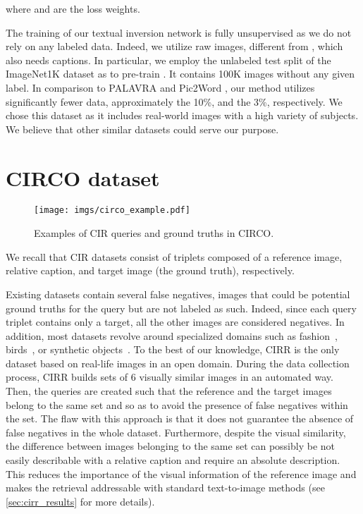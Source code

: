 \documentclass[10pt,twocolumn,letterpaper]{article}
\begin{document}
where  and  are the loss weights.

The training of our textual inversion network  is fully unsupervised as we do not rely on any labeled data. Indeed, we utilize raw images, different from \cite{cohen2022this}, which also needs captions. In particular, we employ the unlabeled test split of the ImageNet1K \cite{russakovsky2015imagenet} dataset as  to pre-train . It contains 100K images without any given label. In comparison to PALAVRA \cite{cohen2022this} and Pic2Word \cite{saito2023pic2word}, our method utilizes significantly fewer data, approximately the 10\%, and the 3\%, respectively. We chose this dataset as it includes real-world images with a high variety of subjects. We believe that other similar datasets could serve our purpose.



\section{CIRCO dataset} \label{sec:circo_dataset}

\begin{figure}
    \centering
    \texttt{[image: imgs/circo\_example.pdf]}
    \vspace{-3.5ex}
    \caption{Examples of CIR queries and ground truths in CIRCO.}
    \vspace{-4pt}
    \label{fig:circo_example}
\end{figure}

We recall that CIR datasets consist of triplets  composed of a reference image, relative caption, and target image (\ie the ground truth), respectively. 

Existing datasets contain several false negatives, \ie images that could be potential ground truths for the query but are not labeled as such. Indeed, since each query triplet contains only a target, all the other images are considered negatives. In addition, most datasets revolve around specialized domains such as fashion~\cite{berg2010automatic, han2017automatic, wu2021fashion, guo2018dialog}, birds~\cite{forbes2019neural}, or synthetic objects~\cite{vo2019composing}.
To the best of our knowledge, CIRR \cite{liu2021image} is the only dataset based on real-life images in an open domain. During the data collection process, CIRR builds sets of 6 visually similar images in an automated way. Then, the queries are created such that the reference and the target images belong to the same set and so as to avoid the presence of false negatives within the set. The flaw with this approach is that it does not guarantee the absence of false negatives in the whole dataset. Furthermore, despite the visual similarity, the difference between images belonging to the same set can possibly be not easily describable with a relative caption and require an absolute description. This reduces the importance of the visual information of the reference image and makes the retrieval addressable with standard text-to-image methods (see \cref{sec:cirr_results} for more details).
\end{document}
